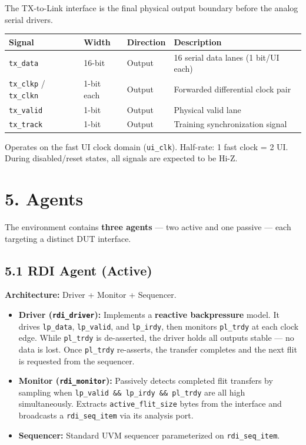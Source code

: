 \documentclass[11pt,a4paper]{article}
\begin{document}
The TX-to-Link interface is the final physical output boundary before the analog serial drivers.


\begin{tabularx}{\textwidth}{|X|X|X|X|}
\hline
\textbf{Signal} & \textbf{Width} & \textbf{Direction} & \textbf{Description} \\
\hline
\texttt{tx\_data} & 16-bit & Output & 16 serial data lanes (1 bit/UI each) \\
\hline
\texttt{tx\_clkp} / \texttt{tx\_clkn} & 1-bit each & Output & Forwarded differential clock pair \\
\hline
\texttt{tx\_valid} & 1-bit & Output & Physical valid lane \\
\hline
\texttt{tx\_track} & 1-bit & Output & Training synchronization signal \\
\hline
\end{tabularx}


Operates on the fast UI clock domain (\texttt{ui\_clk}). Half-rate: 1 fast clock = 2 UI. During disabled/reset states, all signals are expected to be Hi-Z.


\section{5. Agents}

The environment contains \textbf{three agents} --- two active and one passive --- each targeting a distinct DUT interface.

\subsection{5.1 RDI Agent (Active)}

\textbf{Architecture:} Driver + Monitor + Sequencer.

\begin{itemize}
  \item \textbf{Driver (\texttt{rdi\_driver}):} Implements a \textbf{reactive backpressure} model. It drives \texttt{lp\_data}, \texttt{lp\_valid}, and \texttt{lp\_irdy}, then monitors \texttt{pl\_trdy} at each clock edge. While \texttt{pl\_trdy} is de-asserted, the driver holds all outputs stable --- no data is lost. Once \texttt{pl\_trdy} re-asserts, the transfer completes and the next flit is requested from the sequencer.
  \item \textbf{Monitor (\texttt{rdi\_monitor}):} Passively detects completed flit transfers by sampling when \texttt{lp\_valid \&\& lp\_irdy \&\& pl\_trdy} are all high simultaneously. Extracts \texttt{active\_flit\_size} bytes from the interface and broadcasts a \texttt{rdi\_seq\_item} via its analysis port.
  \item \textbf{Sequencer:} Standard UVM sequencer parameterized on \texttt{rdi\_seq\_item}.
\end{itemize}
\end{document}
